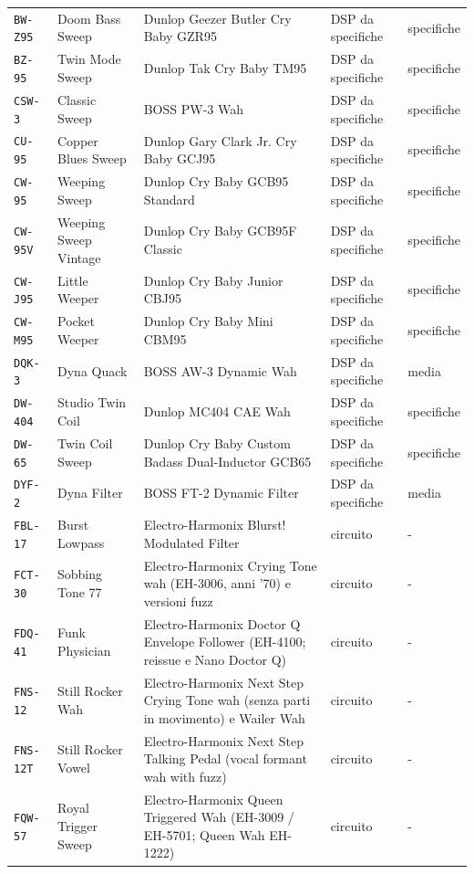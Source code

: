 \begin{xltabular}{\linewidth}{@{}l l X l l@{}}
\texttt{BW-Z95} & Doom Bass Sweep & Dunlop Geezer Butler Cry Baby GZR95 & DSP da specifiche & specifiche\\
\texttt{BZ-95} & Twin Mode Sweep & Dunlop Tak Cry Baby TM95 & DSP da specifiche & specifiche\\
\texttt{CSW-3} & Classic Sweep & BOSS PW-3 Wah & DSP da specifiche & specifiche\\
\texttt{CU-95} & Copper Blues Sweep & Dunlop Gary Clark Jr. Cry Baby GCJ95 & DSP da specifiche & specifiche\\
\texttt{CW-95} & Weeping Sweep & Dunlop Cry Baby GCB95 Standard & DSP da specifiche & specifiche\\
\texttt{CW-95V} & Weeping Sweep Vintage & Dunlop Cry Baby GCB95F Classic & DSP da specifiche & specifiche\\
\texttt{CW-J95} & Little Weeper & Dunlop Cry Baby Junior CBJ95 & DSP da specifiche & specifiche\\
\texttt{CW-M95} & Pocket Weeper & Dunlop Cry Baby Mini CBM95 & DSP da specifiche & specifiche\\
\texttt{DQK-3} & Dyna Quack & BOSS AW-3 Dynamic Wah & DSP da specifiche & media\\
\texttt{DW-404} & Studio Twin Coil & Dunlop MC404 CAE Wah & DSP da specifiche & specifiche\\
\texttt{DW-65} & Twin Coil Sweep & Dunlop Cry Baby Custom Badass Dual-Inductor GCB65 & DSP da specifiche & specifiche\\
\texttt{DYF-2} & Dyna Filter & BOSS FT-2 Dynamic Filter & DSP da specifiche & media\\
\texttt{FBL-17} & Burst Lowpass & Electro-Harmonix Blurst! Modulated Filter & circuito & -\\
\texttt{FCT-30} & Sobbing Tone 77 & Electro-Harmonix Crying Tone wah (EH-3006, anni '70) e versioni fuzz & circuito & -\\
\texttt{FDQ-41} & Funk Physician & Electro-Harmonix Doctor Q Envelope Follower (EH-4100; reissue e Nano Doctor Q) & circuito & -\\
\texttt{FNS-12} & Still Rocker Wah & Electro-Harmonix Next Step Crying Tone wah (senza parti in movimento) e Wailer Wah & circuito & -\\
\texttt{FNS-12T} & Still Rocker Vowel & Electro-Harmonix Next Step Talking Pedal (vocal formant wah with fuzz) & circuito & -\\
\texttt{FQW-57} & Royal Trigger Sweep & Electro-Harmonix Queen Triggered Wah (EH-3009 / EH-5701; Queen Wah EH-1222) & circuito & -\\

\end{xltabular}

